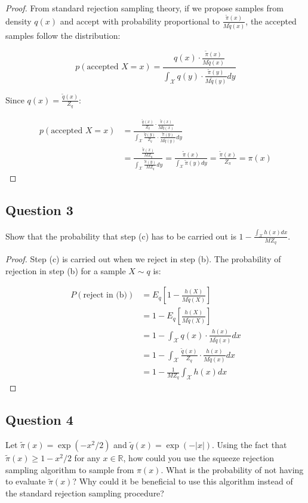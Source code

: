 \begin{proof}
From standard rejection sampling theory, if we propose samples from density $q(x)$ and accept with probability proportional to $\frac{\tilde{\pi}(x)}{M\tilde{q}(x)}$, the accepted samples follow the distribution:

\[p(\text{accepted } X = x) = \frac{q(x) \cdot \frac{\tilde{\pi}(x)}{M\tilde{q}(x)}}{\int_\mathcal{X} q(y) \cdot \frac{\tilde{\pi}(y)}{M\tilde{q}(y)} dy}\]

Since $q(x) = \frac{\tilde{q}(x)}{Z_q}$:

\begin{align*}
p(\text{accepted } X = x) &= \frac{\frac{\tilde{q}(x)}{Z_q} \cdot \frac{\tilde{\pi}(x)}{M\tilde{q}(x)}}{\int_\mathcal{X} \frac{\tilde{q}(y)}{Z_q} \cdot \frac{\tilde{\pi}(y)}{M\tilde{q}(y)} dy}\\
&= \frac{\frac{\tilde{\pi}(x)}{MZ_q}}{\int_\mathcal{X} \frac{\tilde{\pi}(y)}{MZ_q} dy} = \frac{\tilde{\pi}(x)}{\int_\mathcal{X} \tilde{\pi}(y) dy} = \frac{\tilde{\pi}(x)}{Z_\pi} = \pi(x)
\end{align*}
\end{proof}

\subsection*{Question 3}
Show that the probability that step (c) has to be carried out is $1 - \frac{\int_\mathcal{X} h(x)dx}{MZ_q}$.

\begin{proof}
Step (c) is carried out when we reject in step (b). The probability of rejection in step (b) for a sample $X \sim q$ is:

\begin{align*}
P(\text{reject in (b)}) &= E_q\left[1 - \frac{h(X)}{M\tilde{q}(X)}\right]\\
&= 1 - E_q\left[\frac{h(X)}{M\tilde{q}(X)}\right]\\
&= 1 - \int_\mathcal{X} q(x) \cdot \frac{h(x)}{M\tilde{q}(x)} dx\\
&= 1 - \int_\mathcal{X} \frac{\tilde{q}(x)}{Z_q} \cdot \frac{h(x)}{M\tilde{q}(x)} dx\\
&= 1 - \frac{1}{MZ_q} \int_\mathcal{X} h(x) dx
\end{align*}
\end{proof}

\subsection*{Question 4}
Let $\tilde{\pi}(x) = \exp(-x^2/2)$ and $\tilde{q}(x) = \exp(-|x|)$. 
Using the fact that $\tilde{\pi}(x) \geq 1 - x^2/2$ for any $x \in \mathbb{R}$, 
how could you use the squeeze rejection sampling algorithm to sample 
from $\pi(x)$. What is the probability of not having to evaluate
$\tilde{\pi}(x)$? Why could it be beneficial to use this algorithm instead of 
the standard rejection sampling procedure?

